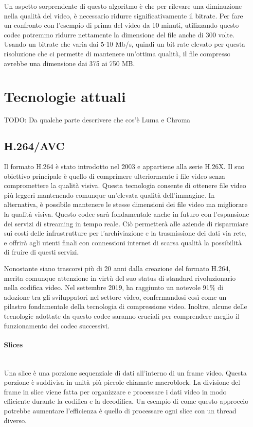\documentclass[a4paper,12pt, oneside]{article}
\begin{document}
\noindent Un aspetto sorprendente di questo algoritmo è che per rilevare una diminuzione nella qualità
del video, è necessario ridurre significativamente il bitrate. Per fare un confronto con l'esempio di
prima del video da 10 minuti, utilizzando questo codec potremmo ridurre nettamente la dimensione del
file anche di 300 volte. Usando un bitrate che varia dai 5-10 Mb/s, quindi un bit rate elevato per
questa risoluzione che ci permette di mantenere un'ottima qualità, il file compresso avrebbe una
dimensione dai 375 ai 750 MB.

\section{Tecnologie attuali}
TODO: Da qualche parte descrivere che cos'è Luma e Chroma
\subsection{H.264/AVC}
Il formato H.264 è stato introdotto nel 2003 e appartiene alla serie H.26X. Il suo obiettivo principale
è quello di comprimere ulteriormente i file video senza compromettere la qualità visiva. Questa
tecnologia consente di ottenere file video più leggeri mantenendo comunque un'elevata qualità
dell'immagine. In alternativa, è possibile mantenere le stesse dimensioni dei file video ma migliorare
la qualità visiva. Questo codec sarà fondamentale anche in futuro con l'espansione dei servizi di
streaming in tempo reale. Ciò permetterà alle aziende di risparmiare sui costi delle infrastrutture
per l'archiviazione e la trasmissione dei dati via rete, e offrirà agli utenti finali con connessioni
internet di scarsa qualità la possibilità di fruire di questi servizi.

Nonostante siano trascorsi più di 20 anni dalla creazione del formato H.264, merita comunque attenzione
in virtù del suo status di standard rivoluzionario nella codifica video. Nel settembre 2019, ha
raggiunto un notevole 91\% di adozione tra gli sviluppatori nel settore video, confermandosi così come
un pilastro fondamentale della tecnologia di compressione video. Inoltre, alcune delle tecnologie
adottate da questo codec saranno cruciali per comprendere meglio il funzionamento dei codec successivi.

\paragraph{Slices}\hphantom{A}\\
Una slice è una porzione sequenziale di dati all'interno di un frame video. Questa porzione è suddivisa
in unità più piccole chiamate macroblock. La divisione del frame in slice viene fatta per organizzare e
processare i dati video in modo efficiente durante la codifica e la decodifica. Un esempio di come
questo approccio potrebbe aumentare l'efficienza è quello di processare ogni slice con un thread diverso.
\end{document}
